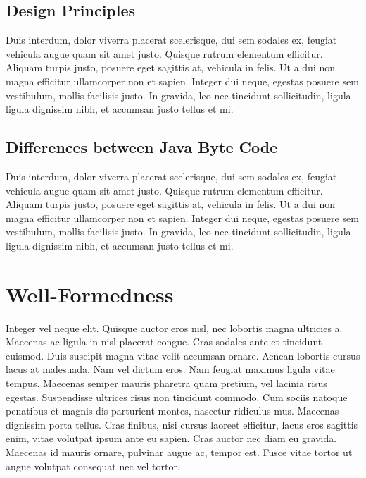 \subsection{Design Principles}
Duis interdum, dolor viverra placerat scelerisque, dui sem sodales ex, feugiat vehicula augue quam sit amet justo. Quisque rutrum elementum efficitur. Aliquam turpis justo, posuere eget sagittis at, vehicula in felis. Ut a dui non magna efficitur ullamcorper non et sapien. Integer dui neque, egestas posuere sem vestibulum, mollis facilisis justo. In gravida, leo nec tincidunt sollicitudin, ligula ligula dignissim nibh, et accumsan justo tellus et mi.

\subsection{Differences between Java Byte Code}
Duis interdum, dolor viverra placerat scelerisque, dui sem sodales ex, feugiat vehicula augue quam sit amet justo. Quisque rutrum elementum efficitur. Aliquam turpis justo, posuere eget sagittis at, vehicula in felis. Ut a dui non magna efficitur ullamcorper non et sapien. Integer dui neque, egestas posuere sem vestibulum, mollis facilisis justo. In gravida, leo nec tincidunt sollicitudin, ligula ligula dignissim nibh, et accumsan justo tellus et mi.

\section{Well-Formedness}
Integer vel neque elit. Quisque auctor eros nisl, nec lobortis magna ultricies a. Maecenas ac ligula in nisl placerat congue. Cras sodales ante et tincidunt euismod. Duis suscipit magna vitae velit accumsan ornare. Aenean lobortis cursus lacus at malesuada. Nam vel dictum eros. Nam feugiat maximus ligula vitae tempus. Maecenas semper mauris pharetra quam pretium, vel lacinia risus egestas. Suspendisse ultrices risus non tincidunt commodo. Cum sociis natoque penatibus et magnis dis parturient montes, nascetur ridiculus mus. Maecenas dignissim porta tellus. Cras finibus, nisi cursus laoreet efficitur, lacus eros sagittis enim, vitae volutpat ipsum ante eu sapien. Cras auctor nec diam eu gravida. Maecenas id mauris ornare, pulvinar augue ac, tempor est. Fusce vitae tortor ut augue volutpat consequat nec vel tortor.


